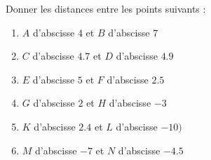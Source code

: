 
\begin{exercice}\label{exo2smath-0047}

    Donner les distances entre les points suivants :
    \begin{enumerate}
        \item
            \( A\) d'abscisse \( 4\) et \( B\) d'abscisse \( 7\)
        \item
            \( C \) d'abscisse \( 4.7\) et \( D\) d'abscisse \( 4.9\)
        \item
            \( E \) d'abscisse \( 5\) et \( F\) d'abscisse \( 2.5\)
        \item
            \( G \) d'abscisse \( 2\) et \( H\) d'abscisse \( -3\)
        \item
            \( K \) d'abscisse \( 2.4\) et \( L\) d'abscisse \( -10)\)
        \item
            \( M \) d'abscisse \( -7\) et \( N\) d'abscisse \( -4.5\)
    \end{enumerate}

\end{exercice}
